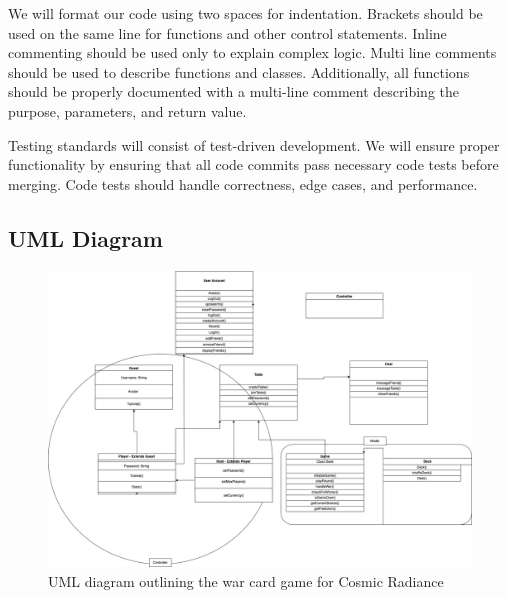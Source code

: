 We will format our code using two spaces for indentation. Brackets should be used on the same line for functions and other control statements. Inline commenting should be used only to explain complex logic. Multi line comments should be used to describe functions and classes. Additionally, all functions should be properly documented with a multi-line comment describing the purpose, parameters, and return value. 

Testing standards will consist of test-driven development. We will ensure proper functionality by ensuring that all code commits pass necessary code tests before merging. Code tests should handle correctness, edge cases, and performance. 

\subsection{UML Diagram}
\begin{figure}
    \centering
    \includegraphics[width=1\linewidth]{figures/WarUML.png}
    \caption{UML diagram outlining the war card game for Cosmic Radiance}
    \label{fig:enter-label}
\end{figure}

